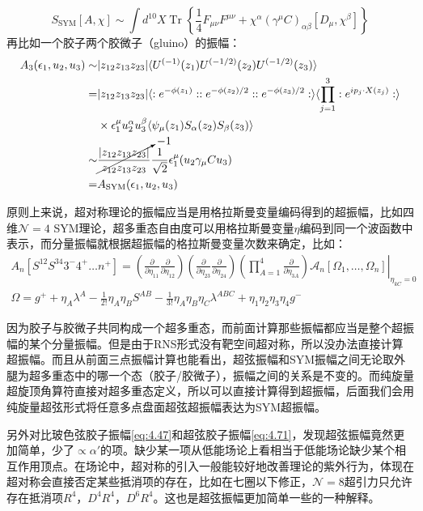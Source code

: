 \begin{equation}
	S_{\mathrm{SYM}}[A,\chi]\sim\int d^{10}X\operatorname{Tr}\left\{\frac{1}{4}F_{\mu\nu}F^{\mu\nu}+\chi^\alpha(\gamma^\mu C)_{\alpha\beta}[D_\mu,\chi^\beta]\right\}
\end{equation}
再比如一个胶子两个胶微子（gluino）的振幅：
\begin{equation}
	\label{eq:4.74}
	\begin{aligned}
		A_3(\epsilon_{1},u_{2},u_{3})\sim&|z_{12}z_{13}z_{23}|\langle U^{(-1)}(z_{1})U^{(-1/2)}(z_{2})U^{(-1/2)}(z_{3})\rangle\\
		=&|z_{12}z_{13}z_{23}|\langle:e^{-\phi(z_1)}::e^{-\phi(z_2)/2}::e^{-\phi(z_3)/2}:\rangle\langle\prod_{j=1}^3:e^{ip_j\cdot X(z_j)}:\rangle\\
		&\times\epsilon_1^\mu u_2^\alpha u_3^\beta\langle\psi_\mu(z_1)S_\alpha(z_2)S_\beta(z_3)\rangle\\
		\sim&\cancelto{-1}{\frac{|z_{12}z_{13}z_{23}|}{z_{12}z_{13}z_{23}}}\frac{1}{\sqrt{2}}\epsilon_1^\mu(u_2\gamma_\mu C u_3)\\
		=&A_{\text{SYM}}(\epsilon_1,u_2,u_3)
	\end{aligned}
\end{equation}

原则上来说，超对称理论的振幅应当是用格拉斯曼变量编码得到的超振幅，比如四维$\mathcal{N}=4$ SYM理论，超多重态自由度可以用格拉斯曼变量$\eta$编码到同一个波函数中表示，而分量振幅就根据超振幅的格拉斯曼变量次数来确定，比如：
\begin{equation}
	\label{eq:4.75}
\begin{gathered}
		A_n\left[S^{12}S^{34}3^-4^+\ldots n^+\right]=\left(\frac{\partial}{\partial\eta_{11}}\frac{\partial}{\partial\eta_{12}}\right)\left(\frac{\partial}{\partial\eta_{23}}\frac{\partial}{\partial\eta_{24}}\right)\left.\left(\prod_{A=1}^4\frac{\partial}{\partial\eta_{3A}}\right)\mathcal{A}_n[\Omega_1,\ldots,\Omega_n]\right|_{\eta_{kC}=0}\\
	\Omega=g^++\eta_A\lambda^A-\frac{1}{2!}\eta_A\eta_BS^{AB}-\frac{1}{3!}\eta_A\eta_B\eta_C\lambda^{ABC}+\eta_1\eta_2\eta_3\eta_4g^-
\end{gathered}
\end{equation}

因为胶子与胶微子共同构成一个超多重态，而前面计算那些振幅都应当是整个超振幅的某个分量振幅。但是由于RNS形式没有靶空间超对称，所以没办法直接计算超振幅。而且从前面三点振幅计算也能看出，超弦振幅和SYM振幅之间无论取外腿为超多重态中的哪一个态（胶子/胶微子），振幅之间的关系是不变的。而纯旋量超旋顶角算符直接对超多重态定义，所以可以直接计算得到超振幅，后面我们会用纯旋量超弦形式将任意多点盘面超弦超振幅表达为SYM超振幅。

另外对比玻色弦胶子振幅\ref{eq:4.47}和超弦胶子振幅\ref{eq:4.71}，发现超弦振幅竟然更加简单，少了$\propto\alpha'$的项。缺少某一项从低能场论上看相当于低能场论缺少某个相互作用顶点。在场论中，超对称的引入一般能较好地改善理论的紫外行为，体现在超对称会直接否定某些抵消项的存在，比如在七圈以下修正，$\mathcal{N}=8$超引力只允许存在抵消项$R^4$，$D^4R^4$，$D^6R^4$\cite{Elvang:2015rqa}。这也是超弦振幅更加简单一些的一种解释。
